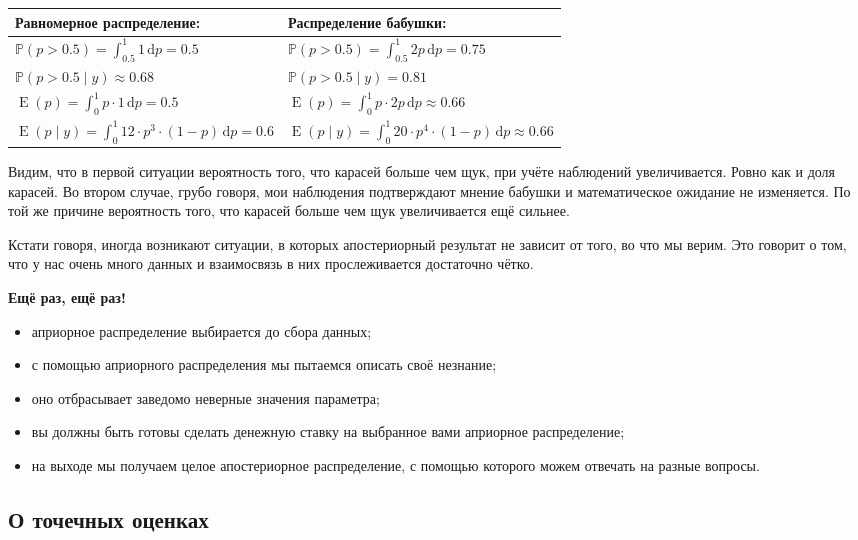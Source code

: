 \documentclass[12pt, a4paper, oneside]{extreport}
\DeclareMathOperator{\E}{\mathop{E}}
\def \mbb{\mathbb}
\def \PP{\mbb{P}}
\newcommand{\dx}[1]{\,\mathrm{d}#1} %
\theoremstyle{plain}              %
\theoremstyle{definition}         %
\begin{document}
\vspace{2ex}

\begin{tabularx}{\textwidth}{X|X}
Равномерное распределение: & Распределение бабушки: \\
\hline
$ \PP( p > 0.5 ) = \int_{0.5}^1 1 \dx{p} = 0.5 $  &   $ \PP( p > 0.5 ) = \int_{0.5}^1 2p \dx{p} = 0.75 $ \\
$\PP( p > 0.5 \mid y) \approx 0.68  $& $\PP( p > 0.5 \mid y) =  0.81 $  \\
$\E(p) = \int_0^1 p \cdot 1 \dx{p} = 0.5 $ & $ \E(p) = \int_0^1 p \cdot 2p \dx{p}  \approx 0.66 $  \\
$\E(p \mid y) = \int_0^1 12 \cdot p^3 \cdot (1-p) \dx{p} = 0.6$ & $\E(p \mid y) = \int_0^1 20  \cdot p^4 \cdot (1-p) \dx{p} \approx 0.66$ \\
\end{tabularx}

\vspace{2ex}

Видим, что в первой ситуации вероятность того, что карасей больше чем щук, при учёте наблюдений увеличивается. Ровно как и доля карасей. Во втором случае, грубо говоря,  мои наблюдения подтверждают мнение бабушки и математическое ожидание не изменяется. По той же причине вероятность того, что карасей больше чем щук увеличивается ещё сильнее. 

Кстати говоря, иногда возникают ситуации, в которых апостериорный результат не зависит от того, во что мы верим. Это говорит о том, что у нас очень много данных и взаимосвязь в них прослеживается достаточно чётко. 

\textbf{Ещё раз, ещё раз!} 

\begin{itemize}
\item  априорное распределение выбирается до сбора данных;
\item  с помощью априорного распределения мы пытаемся описать своё незнание;
\item  оно отбрасывает заведомо неверные значения параметра;
\item  вы должны быть готовы сделать денежную ставку на выбранное вами априорное распределение;
\item  на выходе мы получаем целое апостериорное распределение, с помощью которого можем отвечать на разные вопросы.
\end{itemize}

\subsection*{О точечных оценках} 
\end{document}
